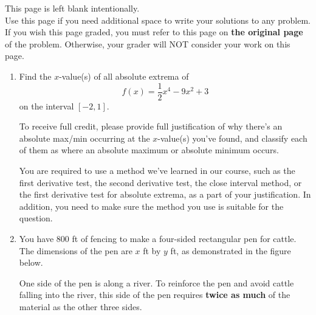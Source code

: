 \documentclass[11pt]{article}
\begin{document}
\vfill


\newpage

This page is left blank intentionally.\\

Use this page if you need additional space to write your solutions to any problem. \\

If you wish this page graded, you must refer to this page on \textbf{the original page} of the problem. Otherwise, your grader will NOT consider your work on this page.

\newpage%


\begin{enumerate}


\item Find the $x$-value(s) of all absolute extrema of  \[f(x)=\dfrac{1}{2}x^4-9x^2+3\] on the interval $[-2, 1]$.

To receive full credit, please provide full justification of why there's an absolute max/min occurring at the $x$-value(s) you've found, and classify each of them as where an absolute maximum or absolute minimum occurs.

You are required to use a method we've learned in our course, such as the first derivative test, the second derivative test, the close interval method, or the first derivative test for absolute extrema, as a part of your justification. In addition, you need to make sure the method you use is suitable for the question.


\newpage


\item You have 800 ft of fencing to make a four-sided rectangular pen for cattle. The dimensions of the pen are $x$ ft by $y$ ft, as demonstrated in the figure below.

One side of the pen is along a river. To reinforce the pen and avoid cattle falling into the river, this side of the pen requires \textbf{twice as much} of the material as the other three sides. 


\end{enumerate}
\end{document}
